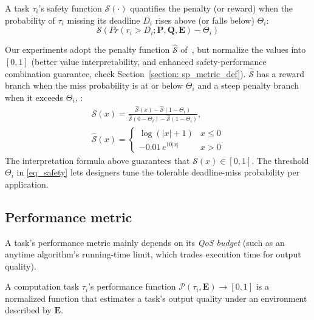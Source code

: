 	\begin{definition}
		A task $\tau_i$'s safety function $\mathcal{S}(\cdot)$ quantifies the penalty (or reward) when the probability of $\tau_i$ missing its deadline $D_i$ rises above (or falls below) $\Theta_i$:
		\begin{equation}
			\mathcal{S}(Pr(r_i > D_i ; \boldsymbol{P}, \boldsymbol{Q}, \textbf{E}) - \Theta_i)
			\label{eq_safety_function}
		\end{equation}
	\end{definition}
    Our experiments adopt the penalty function $\hat{\mathcal{S}}$ of~\cite{Ash23RAL}, but normalize the values into $[0,1]$ (better value interpretability, and enhanced safety-performance combination guarantee, check Section~\ref{section: sp_metric_def}). 
	$\hat{\mathcal{S}}$ has a reward branch when the miss probability is at or below $\Theta_i$ and a steep penalty branch when it exceeds $\Theta_i$, :
	\begin{equation}
		\begin{gathered}
		\mathcal{S}(x) = \frac{\hat{\mathcal{S}}(x) - \hat{\mathcal{S}}(1 - \Theta_i)}{\hat{\mathcal{S}}(0-\Theta_i) - \hat{\mathcal{S}}(1 - \Theta_i)},\\
		\hat{\mathcal{S}}(x) = \begin{cases}
			\log(|x|+1) & x \leq 0 \\
			-0.01\, e^{10|x|}  & x > 0
		\end{cases}
		\end{gathered}
		\label{eq_normalize}
	\end{equation}
	The interpretation formula above guarantees that $\mathcal{S}(x) \in [0,1]$.
    The threshold $\Theta_i$ in \eqref{eq_safety} lets designers tune the tolerable deadline-miss probability per application.

	\subsection{Performance metric}
	A task's performance metric mainly depends on its \emph{QoS budget} (such as an anytime algorithm's running-time limit, which trades execution time for output quality). 

	\begin{definition}
    \label{def_perf_metric}
		A computation task $\tau_i$'s performance function $\mathcal{P}(\tau_i, \textbf{E}) \rightarrow [0,1]$ is a normalized function that estimates a task's output quality under an environment described by $\textbf{E}$.
	\end{definition}

